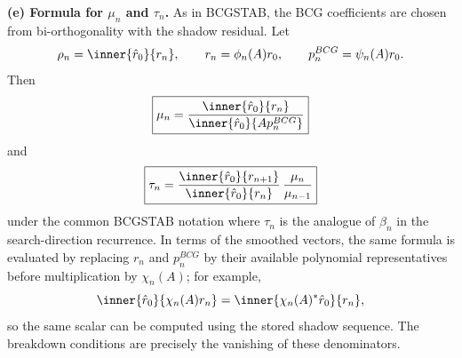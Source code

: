 \documentclass{ctexart}
\begin{document}
\begin{solution}
  \medskip
  \noindent\textbf{(e) Formula for $\mu_n$ and $\tau_n$.}
  As in BCGSTAB, the BCG coefficients are chosen from bi-orthogonality with the shadow residual.  Let
  \[
    \rho_n=\inner{\hat r_0}{r_n},
    \qquad
    r_n=\phi_n(A)r_0,
    \qquad
    p_n^{BCG}=\psi_n(A)r_0.
  \]
  Then
  \[
    \boxed{
      \mu_n=\frac{\inner{\hat r_0}{r_n}}{\inner{\hat r_0}{A p_n^{BCG}}}
    }
  \]
  and
  \[
    \boxed{
      \tau_n=\frac{\inner{\hat r_0}{r_{n+1}}}{\inner{\hat r_0}{r_n}}\,\frac{\mu_n}{\mu_{n-1}}
    }
  \]
  under the common BCGSTAB notation where $\tau_n$ is the analogue of $\beta_n$ in the search-direction recurrence.  In terms of the smoothed vectors, the same formula is evaluated by replacing $r_n$ and $p_n^{BCG}$ by their available polynomial representatives before multiplication by $\chi_n(A)$; for example,
  \[
    \inner{\hat r_0}{\chi_n(A)r_n}
    =\inner{\chi_n(A)^*\hat r_0}{r_n},
  \]
  so the same scalar can be computed using the stored shadow sequence.  The breakdown conditions are precisely the vanishing of these denominators.
\end{solution}
\end{document}
